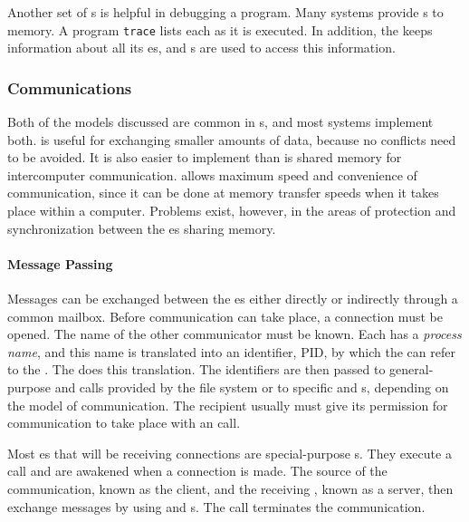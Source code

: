 Another set of s is helpful in debugging a program.
Many systems provide s to  memory.
A program \texttt{trace} lists each  as it is executed.
In addition, the  keeps information about all its es, and s are used to access this information.

\subsubsection{Communications}\label{subsubsec:Communications}
Both of the models discussed are common in s, and most systems implement both.
 is useful for exchanging smaller amounts of data, because no conflicts need to be avoided.
It is also easier to implement than is shared memory for intercomputer communication.
 allows maximum speed and convenience of communication, since it can be done at memory transfer speeds when it takes place within a computer.
Problems exist, however, in the areas of protection and synchronization between the es sharing memory.

\paragraph{Message Passing}\label{par:Message_Passing}
Messages can be exchanged between the es either directly or indirectly through a common mailbox.
Before communication can take place, a connection must be opened.
The name of the other communicator must be known.
Each  has a \emph{process name}, and this name is translated into an identifier, PID, by which the  can refer to the .
The   does this translation.
The identifiers are then passed to general-purpose  and  calls provided by the file system or to specific  and  s, depending on the model of communication.
The recipient  usually must give its permission for communication to take place with an  call.

Most es that will be receiving connections are special-purpose s.
They execute a  call and are awakened when a connection is made.
The source of the communication, known as the client, and the receiving , known as a server, then exchange messages by using  and  s.
The  call terminates the communication.

